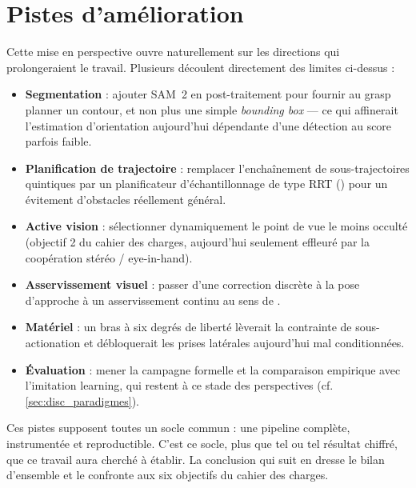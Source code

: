 
\section{Pistes d'amélioration}
\label{sec:disc_pistes}

Cette mise en perspective ouvre naturellement sur les directions qui prolongeraient
le travail. Plusieurs découlent directement des limites ci-dessus :
\begin{itemize}
  \item \textbf{Segmentation} : ajouter SAM~2 en post-traitement pour fournir au
        grasp planner un contour, et non plus une simple \emph{bounding box} ---
        ce qui affinerait l'estimation d'orientation aujourd'hui dépendante d'une
        détection au score parfois faible.
  \item \textbf{Planification de trajectoire} : remplacer l'enchaînement de
        sous-trajectoires quintiques par un planificateur d'échantillonnage de type
        RRT (\cite{lavalle_planning_2006}) pour un évitement d'obstacles réellement
        général.
  \item \textbf{Active vision} : sélectionner dynamiquement le point de vue le moins
        occulté (objectif 2 du cahier des charges, aujourd'hui seulement effleuré
        par la coopération stéréo / eye-in-hand).
  \item \textbf{Asservissement visuel} : passer d'une correction discrète à la pose
        d'approche à un asservissement continu au sens de
        \cite{chaumette_visual_2006}.
  \item \textbf{Matériel} : un bras à six degrés de liberté lèverait la contrainte
        de sous-actionation et débloquerait les prises latérales aujourd'hui mal
        conditionnées.
  \item \textbf{Évaluation} : mener la campagne formelle et la comparaison
        empirique avec l'imitation learning, qui restent à ce stade des
        perspectives (cf. \ref{sec:disc_paradigmes}).
\end{itemize}

Ces pistes supposent toutes un socle commun : une pipeline complète, instrumentée
et reproductible. C'est ce socle, plus que tel ou tel résultat chiffré, que ce
travail aura cherché à établir. La conclusion qui suit en dresse le bilan d'ensemble
et le confronte aux six objectifs du cahier des charges.
